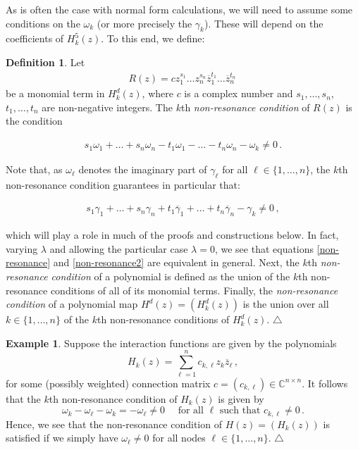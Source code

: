 \documentclass[12pt]{article}
\theoremstyle{plain}
\theoremstyle{definition}
\newtheorem{defi}[thr]{Definition}
\newtheorem{ex}[thr]{Example}
\theoremstyle{remark}
\theoremstyle{remark}
\begin{document}
 As is often the case with normal form calculations, we will need to assume some conditions on the $\omega_k$ (or more precisely the $\gamma_k$). These will depend on the coefficients of ${H}^5_k(z)$. To this end, we define:

\begin{defi}\label{nonreso}
Let
\begin{align}
    R(z) = c z_1^{s_1} \dots  z_n^{s_n} \overline{z}_1^{t_1} \dots \overline{z}_n^{t_n}\, 
\end{align}
be a monomial term in ${H}^d_k(z)$, where $c$ is a complex number and $s_1, \dots, s_n$, $t_1, \dots, t_n$ are non-negative integers. The $k$th \emph{non-resonance condition} of $R(z)$ is the condition

\begin{align}\label{non-resonance}
    s_1\omega_1 + \dots + s_n\omega_n - t_1\omega_1 - \dots - t_n\omega_n - \omega_k \not= 0\, .
\end{align}

Note that, as $\omega_{\ell}$ denotes the imaginary part of $\gamma_{\ell}$ for all $\ell \in \{1, \dots, n\}$, the $k$th non-resonance condition guarantees in particular that:

\begin{align}\label{non-resonance2}
    s_1\gamma_1 + \dots + s_n\gamma_n + t_1\overline{\gamma}_1 + \dots + t_n\overline{\gamma}_n - \gamma_k \not= 0\, ,
\end{align}

\noindent
which will play a role in much of the proofs and constructions below. In fact, varying $\lambda$ and allowing the particular case $\lambda = 0$, we see that equations \eqref{non-resonance} and \eqref{non-resonance2} are equivalent in general. Next, the $k$th \emph{non-resonance condition} of a polynomial is defined as the union of the $k$th non-resonance conditions of all of its monomial terms. 
Finally, the \emph{non-resonance condition} of a polynomial map ${H}^d(z) = ({H}^d_k(z))$ is the union over all $k \in \{1, \dots, n\}$ of the $k$th non-resonance conditions of ${H}^d_k(z)$.  \hfill $\triangle$
\end{defi}

\begin{ex}\label{example0easyinters1}
Suppose the interaction functions are given by the polynomials
\begin{equation}
    H_k(z) = \sum_{\ell=1}^n c_{k, \ell}z_k\overline{z}_\ell\, ,
\end{equation}
for some (possibly weighted) connection matrix $c = (c_{k,\ell}) \in\mathbb{C}^{n \times n}$. It follows that the $k$th non-resonance condition of $H_k(z)$ is given by
\begin{equation}
    \omega_k - {\omega}_{\ell} - \omega_k = -{\omega}_{\ell} \not= 0 \quad \text{ for all } {\ell} \text{ such that } c_{k, \ell} \not= 0 \, .
\end{equation}
Hence, we see that the non-resonance condition of $H(z) = (H_k(z))$ is satisfied if we simply have $\omega_{\ell} \not= 0$ for all nodes ${\ell} \in \{1, \dots, n\}$. \hfill $\triangle$
\end{ex}
\end{document}

